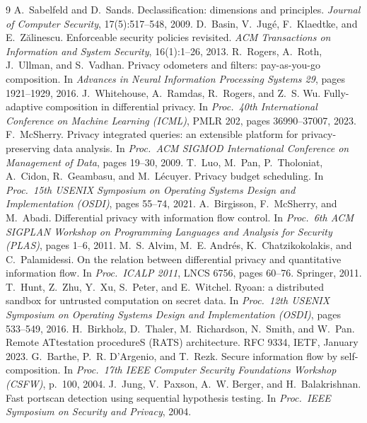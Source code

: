 \documentclass[11pt,a4paper]{article}
\begin{document}
\begin{thebibliography}{9}
 A.~Sabelfeld and D.~Sands. Declassification: dimensions and principles. \emph{Journal
of Computer Security}, 17(5):517--548, 2009.
 D.~Basin, V.~Jug\'e, F.~Klaedtke, and E.~Z\u{a}linescu. Enforceable security
policies revisited. \emph{ACM Transactions on Information and System Security}, 16(1):1--26, 2013.
 R.~Rogers, A.~Roth, J.~Ullman, and S.~Vadhan. Privacy odometers and filters:
pay-as-you-go composition. In \emph{Advances in Neural Information Processing Systems 29}, pages
1921--1929, 2016.
 J.~Whitehouse, A.~Ramdas, R.~Rogers, and Z.~S. Wu. Fully-adaptive composition in
differential privacy. In \emph{Proc.\ 40th International Conference on Machine Learning (ICML)},
PMLR 202, pages 36990--37007, 2023.
 F.~McSherry. Privacy integrated queries: an extensible platform for
privacy-preserving data analysis. In \emph{Proc.\ ACM SIGMOD International Conference on Management
of Data}, pages 19--30, 2009.
 T.~Luo, M.~Pan, P.~Tholoniat, A.~Cidon, R.~Geambasu, and M.~L\'ecuyer. Privacy
budget scheduling. In \emph{Proc.\ 15th USENIX Symposium on Operating Systems Design and
Implementation (OSDI)}, pages 55--74, 2021.
 A.~Birgisson, F.~McSherry, and M.~Abadi. Differential privacy with information flow
control. In \emph{Proc.\ 6th ACM SIGPLAN Workshop on Programming Languages and Analysis for
Security (PLAS)}, pages 1--6, 2011.
 M.~S. Alvim, M.~E. Andr\'es, K.~Chatzikokolakis, and C.~Palamidessi. On the
relation between differential privacy and quantitative information flow. In \emph{Proc.\ ICALP
2011}, LNCS 6756, pages 60--76. Springer, 2011.
 T.~Hunt, Z.~Zhu, Y.~Xu, S.~Peter, and E.~Witchel. Ryoan: a distributed sandbox for
untrusted computation on secret data. In \emph{Proc.\ 12th USENIX Symposium on Operating Systems
Design and Implementation (OSDI)}, pages 533--549, 2016.
 H.~Birkholz, D.~Thaler, M.~Richardson, N.~Smith, and W.~Pan. Remote ATtestation
procedureS (RATS) architecture. RFC 9334, IETF, January 2023.
 G.~Barthe, P.~R. D'Argenio, and T.~Rezk. Secure information flow by
self-composition. In \emph{Proc.\ 17th IEEE Computer Security Foundations Workshop (CSFW)},
p.~100, 2004.
 J.~Jung, V.~Paxson, A.~W. Berger, and H.~Balakrishnan. Fast portscan detection
using sequential hypothesis testing. In \emph{Proc.\ IEEE Symposium on Security and Privacy},
2004.
\end{thebibliography}
\end{document}
